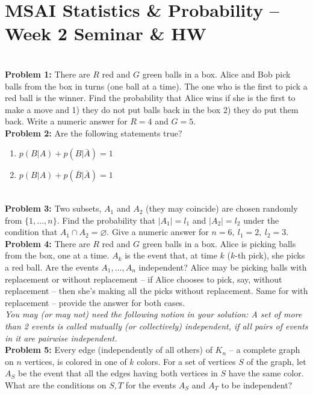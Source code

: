 \documentclass[12pt]{article}
\numberwithin{equation}{section}
\begin{document}
\section*{MSAI Statistics \& Probability – Week 2 Seminar \& HW}\\

\textbf{Problem 1:} There are $R$ red and $G$ green balls in a box. Alice and Bob pick balls from the box in turns (one ball at a time). The one who is the first to pick a red ball is the winner. Find the probability that Alice wins if she is the first to make a move and 1) they do not put balls back in the box 2) they do put them back. Write a numeric answer for $R=4$ and $G=5$.
\\

\textbf{Problem 2:} Are the following statements true?
\begin{enumerate}
    \item $p(B|A)+p(B|\bar{A})=1$
    \item $p(B|A)+p(\bar{B}|\bar{A})=1$
\end{enumerate}
\\

\textbf{Problem 3:} Two subsets, $A_1$ and $A_2$ (they may coincide) are chosen randomly from $\{1,\dots,n\}$. Find the probability that $|A_1|=l_1$ and $|A_2|=l_2$ under the condition that $A_1\cap A_2=\varnothing.$ Give a numeric answer for $n=6,~l_1=2,~l_2=3.$
\\

\textbf{Problem 4:} There are $R$ red and $G$ green balls in a box. Alice is picking balls from the box, one at a time. $A_k$ is the event that, at time $k$ ($k$-th pick), she picks a red ball. Are the events $A_1,\dots,A_n$ independent? Alice may be picking balls with replacement or without replacement – if Alice chooses to pick, say, without replacement – then she's making all the picks without replacement. Same for with replacement – provide the answer for both cases. \\
\textit{You may (or may not) need the following notion in your solution: A set of more than 2 events is called mutually (or collectively) independent, if all pairs of events in it are pairwise independent.}
\\

\textbf{Problem 5:} Every edge (independently of all others) of $K_n$ – a complete graph on $n$ vertices, is colored in one of $k$
colors. For a set of vertices $S$ of the graph, let $A_S$ be the event that all the edges having both vertices in $S$ have the same color. What are the conditions on $S,T$ for the events $A_S$ and $A_T$ to be independent?
\end{document}
